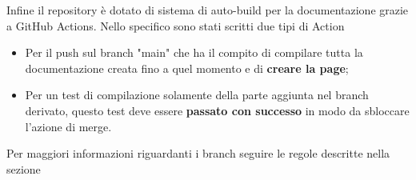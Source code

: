 Infine il repository è dotato di sistema di auto-build per la documentazione grazie a GitHub Actions. Nello specifico sono stati scritti due tipi di Action
\begin{itemize}
      \item Per il push sul branch "main" che ha il compito di compilare tutta la
            documentazione creata fino a quel momento e di \textbf{creare la page};
      \item Per un test di compilazione solamente della parte aggiunta nel branch derivato,
            questo test deve essere \textbf{passato con successo} in modo da sbloccare
            l'azione di merge.
\end{itemize}
Per maggiori informazioni riguardanti i branch seguire le regole descritte nella sezione 


